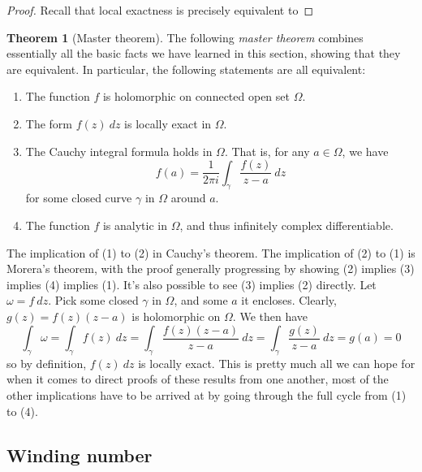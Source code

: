 \documentclass[aps,pra,showpacs,notitlepage,onecolumn,superscriptaddress,nofootinbib]{revtex4-1}
\theoremstyle{definition}
\newtheorem{theorem}{Theorem}[section]
\begin{document}
\begin{proof}
  Recall that local exactness is precisely equivalent to 
\end{proof}

\begin{theorem}[Master theorem]
  The following \emph{master theorem} combines essentially all the basic facts we have learned in this section, showing that they are equivalent.
  In particular, the following statements are all equivalent:
  \begin{enumerate}
  \item The function $f$ is holomorphic on connected open set $\Omega$.
  \item The form $f(z) \ dz$ is locally exact in $\Omega$.
  \item The Cauchy integral formula holds in $\Omega$. That is,
    for any $a \in \Omega$, we have
    \begin{equation}
      f(a) = \frac{1}{2\pi i} \displaystyle\int_{\gamma} \frac{f(z)}{z - a} \ dz
    \end{equation}
    for some closed curve $\gamma$ in $\Omega$ around $a$.
  \item The function $f$ is analytic in $\Omega$, and thus infinitely complex differentiable.
    \end{enumerate}
\end{theorem}

The implication of (1) to (2) in Cauchy's theorem. The implication of (2) to (1) is Morera's theorem, with the proof generally progressing by showing (2) implies (3) implies (4) implies (1).
It's also possible to see (3) implies (2) directly. Let $\omega = f \ dz$. Pick some closed $\gamma$ in $\Omega$, and some $a$ it encloses. Clearly, $g(z) = f(z) (z - a)$ is holomorphic on $\Omega$.
We then have
\begin{equation}
\displaystyle\int_{\gamma} \omega = \displaystyle\int_{\gamma} f(z) \ dz = \displaystyle\int_{\gamma} \frac{f(z) (z - a)}{z - a} \ dz = \displaystyle\int_{\gamma} \frac{g(z)}{z - a} \ dz = g(a) = 0
\end{equation}
so by definition, $f(z) \ dz$ is locally exact. This is pretty much all we can hope for when it comes to direct proofs of these results from one another, most of the other implications have
to be arrived at by going through the full cycle from (1) to (4).

\subsection{Winding number}
\end{document}
